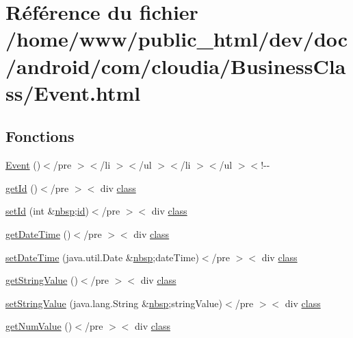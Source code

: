 \hypertarget{_event_8html}{\section{Référence du fichier /home/www/public\-\_\-html/dev/doc/android/com/cloudia/\-Business\-Class/\-Event.html}
\label{_event_8html}
}
\subsection*{Fonctions}
\begin{DoxyCompactItemize}
\item 
\hyperlink{_event_8html_a76d19e4761773af319068376f64d4cca}{Event} ()$<$/pre $>$$<$/li $>$$<$/ul $>$$<$/li $>$$<$/ul $>$$<$!-\/-\/
\item 
\hyperlink{_event_8html_a4063bd8d2824b1643a7365d472cc0c4b}{get\-Id} ()$<$/pre $>$$<$ div \hyperlink{_tools_8html_acf06f836132665ba8114f5a414c2403f}{class}
\item 
\hyperlink{_event_8html_ad3d1c59471651f6b599a848d6d31e3b7}{set\-Id} (int \&\hyperlink{_tools_8html_aef915316f784c9063d942974538301a6}{nbsp};\hyperlink{index-9_8html_aa9b8ff1d03b739d1e752b9d9a5aa7c98}{id})$<$/pre $>$$<$ div \hyperlink{_tools_8html_acf06f836132665ba8114f5a414c2403f}{class}
\item 
\hyperlink{_event_8html_a54b95a3a9682a00dd7dccecdc95c37be}{get\-Date\-Time} ()$<$/pre $>$$<$ div \hyperlink{_tools_8html_acf06f836132665ba8114f5a414c2403f}{class}
\item 
\hyperlink{_event_8html_aafd0f0097c50156624f819621d1ab8f2}{set\-Date\-Time} (java.\-util.\-Date \&\hyperlink{_tools_8html_aef915316f784c9063d942974538301a6}{nbsp};date\-Time)$<$/pre $>$$<$ div \hyperlink{_tools_8html_acf06f836132665ba8114f5a414c2403f}{class}
\item 
\hyperlink{_event_8html_a0c360330b448d0556c4941b9c59f0c7c}{get\-String\-Value} ()$<$/pre $>$$<$ div \hyperlink{_tools_8html_acf06f836132665ba8114f5a414c2403f}{class}
\item 
\hyperlink{_event_8html_ac85a47a5d0331a39232bd679d6dd0b27}{set\-String\-Value} (java.\-lang.\-String \&\hyperlink{_tools_8html_aef915316f784c9063d942974538301a6}{nbsp};string\-Value)$<$/pre $>$$<$ div \hyperlink{_tools_8html_acf06f836132665ba8114f5a414c2403f}{class}
\item 
\hyperlink{_event_8html_af9f70d3510187c269224e052f6d9c427}{get\-Num\-Value} ()$<$/pre $>$$<$ div \hyperlink{_tools_8html_acf06f836132665ba8114f5a414c2403f}{class}

\end{DoxyCompactItemize}
